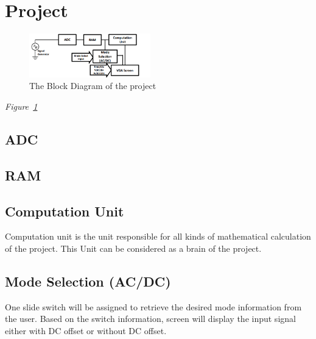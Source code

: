 \section{Project}
\- \indent


\begin{figure}[h!]
	\setlength{\unitlength}{\textwidth}
	\center 
	\includegraphics[width=0.47\textwidth]{block_diagram}
	\caption{\label{fig:block_diagram}The Block Diagram of the project}
\end{figure}

	 \textit{Figure~\ref{fig:block_diagram}}    

	

\subsection{ADC} \- \indent
	

\subsection{RAM} \- \indent

\subsection{Computation Unit} \- \indent
	Computation unit is the unit responsible for all kinds of mathematical calculation of the project. This Unit can be considered as a brain of the project. 

\subsection{Mode Selection (AC/DC)} \- \indent
	One slide switch will be assigned to retrieve the desired mode information from the user. Based on the switch information, screen will display the input signal either with DC offset or without DC offset.

